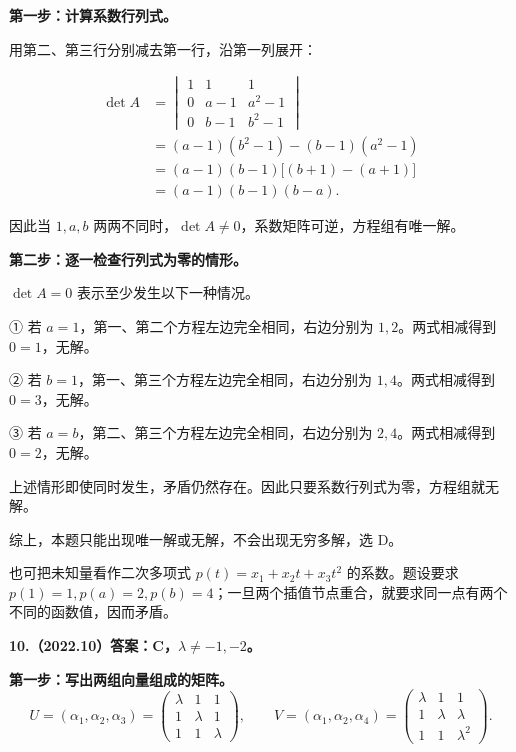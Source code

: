 \documentclass[UTF8,11pt,fontset=windows]{ctexart}
\begin{document}
\textbf{第一步：计算系数行列式。}

用第二、第三行分别减去第一行，沿第一列展开：

$$
\begin{aligned}
\det A
&=\begin{vmatrix}1&1&1\\0&a-1&a^2-1\\0&b-1&b^2-1\end{vmatrix}\\
&=(a-1)(b^2-1)-(b-1)(a^2-1)\\
&=(a-1)(b-1)\bigl[(b+1)-(a+1)\bigr]\\
&=(a-1)(b-1)(b-a).
\end{aligned}
$$

因此当 $1,a,b$ 两两不同时，$\det A\ne0$，系数矩阵可逆，方程组有唯一解。

\textbf{第二步：逐一检查行列式为零的情形。}

$\det A=0$ 表示至少发生以下一种情况。

① 若 $a=1$，第一、第二个方程左边完全相同，右边分别为 $1,2$。两式相减得到 $0=1$，无解。

② 若 $b=1$，第一、第三个方程左边完全相同，右边分别为 $1,4$。两式相减得到 $0=3$，无解。

③ 若 $a=b$，第二、第三个方程左边完全相同，右边分别为 $2,4$。两式相减得到 $0=2$，无解。

上述情形即使同时发生，矛盾仍然存在。因此只要系数行列式为零，方程组就无解。

综上，本题只能出现唯一解或无解，不会出现无穷多解，选 D。

也可把未知量看作二次多项式 $p(t)=x_1+x_2t+x_3t^2$ 的系数。题设要求 $p(1)=1,p(a)=2,p(b)=4$；一旦两个插值节点重合，就要求同一点有两个不同的函数值，因而矛盾。

\clearpage

\textbf{10.（2022.10）答案：C，$\lambda\ne-1,-2$。}

\textbf{第一步：写出两组向量组成的矩阵。}
$$
U=(\alpha_1,\alpha_2,\alpha_3)
=\begin{pmatrix}\lambda&1&1\\1&\lambda&1\\1&1&\lambda\end{pmatrix},
\qquad
V=(\alpha_1,\alpha_2,\alpha_4)
=\begin{pmatrix}\lambda&1&1\\1&\lambda&\lambda\\1&1&\lambda^2\end{pmatrix}.
$$
\end{document}
